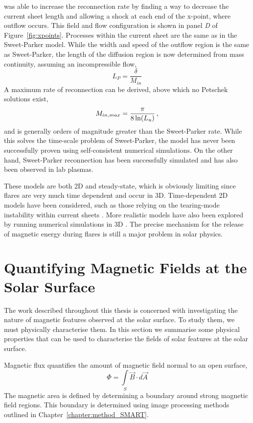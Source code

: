 \cite{Petschek:1964} was able to increase the reconnection rate by finding a way to decrease the current sheet length and allowing a shock at each end of the x-point, where outflow occurs. This field and flow configuration is shown in panel \emph{D} of Figure~\ref{fig:xpoints}. Processes within the current sheet are the same as in the Sweet-Parker model. While the width and speed of the outflow region is the same as Sweet-Parker, the length of the diffusion region is now determined from mass continuity, assuming an incompressible flow,
\begin{equation}
L_{P} = \frac{\delta}{M_{in}}  
\end{equation}
A maximum rate of reconnection can be derived, above which no Petschek solutions exist,
\begin{equation}
M_{in,max} = \frac{\pi}{ 8 \ln(L_u) } \mbox{\,,}
\end{equation}
and is generally orders of magnitude greater than the Sweet-Parker rate. While this solves the time-scale problem of Sweet-Parker, the model has never been successfully proven using self-consistent numerical simulations. On the other hand, Sweet-Parker reconnection has been successfully simulated and has also been observed in lab plasmas. 

These models are both 2D and steady-state, which is obviously limiting since flares are very much time dependent and occur in 3D. Time-dependent 2D models have been considered, such as those relying on the tearing-mode instability within current sheets \citep{Forbes:2006}. More realistic models have also been explored by running numerical simulations in 3D \citep{Yamada:2010}. The precise mechanism for the release of magnetic energy during flares is still a major problem in solar physics. 

\section{Quantifying Magnetic Fields at the Solar Surface}

The work described throughout this thesis is concerned with investigating the nature of magnetic features observed at the solar surface. To study them, we must physically characterise them. In this section we summarise some physical properties that can be used to characterise the fields of solar features at the solar surface.

Magnetic flux quantifies the amount of magnetic field normal to an open surface,
\begin{equation}
\Phi = \int\limits_S \vec{B} \cdot d\vec{A}  
\end{equation}
The magnetic area is defined by determining a boundary around strong magnetic field regions. This boundary is determined using image processing methods outlined in Chapter~\ref{chapter:method_SMART}.

